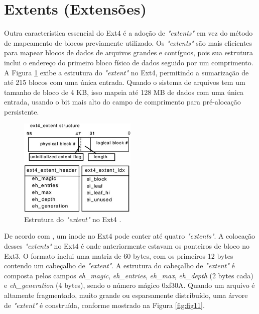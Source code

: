 \documentclass[
	12pt,				%
	openright,			%
	oneside,			%
	a4paper,			%
	chapter=TITLE,		%
	english,			%
	french,				%
	spanish,			%
	brazil				%
	]{abntex2}
\theoremstyle{definition}
\begin{document}
\section{Extents (Extensões)}

Outra característica essencial do Ext4 é a adoção de \textit{"extents"} em vez do método de mapeamento 
de blocos previamente utilizado. Os \textit{"extents"} são mais eficientes 
para mapear blocos de dados de arquivos grandes e contíguos, pois sua estrutura inclui o endereço do 
primeiro bloco físico de dados seguido por um comprimento. A Figura \ref{fig:fig10} exibe a estrutura 
do \textit{"extent"} no Ext4, permitindo a sumarização de até 215 blocos com uma única entrada. 
Quando o sistema de arquivos tem um tamanho de bloco de 4 KB, isso mapeia até 128 MB de dados 
com uma única entrada, usando o bit mais alto do campo de comprimento para pré-alocação persistente.

\begin{figure}[H]
    \centering
    \includegraphics[width=0.5\textwidth]{fig10.jpg}
    \caption{Estrutura do \textit{"extent"} no Ext4 \cite{matur}.}
    \label{fig:fig10}
\end{figure}

De acordo com \cite{matur}, um inode no Ext4 pode conter até quatro \textit{"extents"}. A 
colocação desses \textit{"extents"} no Ext4 é onde anteriormente estavam os ponteiros de bloco no 
Ext3. O formato inclui uma matriz de 60 bytes, com os primeiros 12 bytes contendo um cabeçalho de 
\textit{"extent"}. A estrutura do cabeçalho de \textit{"extent"} é composta pelos campos 
\textit{eh\_magic}, \textit{eh\_entries}, \textit{eh\_max}, \textit{eh\_depth} 
(2 bytes cada) e \textit{eh\_generation} (4 bytes), sendo o número mágico 0xf30A. 
Quando um arquivo é altamente fragmentado, muito grande ou esparsamente distribuído, 
uma árvore de \textit{"extent"} é construída, conforme mostrado na Figura \ref{fig:fig11}.
\end{document}
